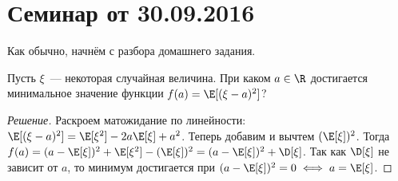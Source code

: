 \section{Семинар от 30.09.2016}
Как обычно, начнём с разбора домашнего задания.
\begin{problem}
    Пусть \(\xi\)~--- некоторая случайная величина. При каком \(a \in \R\) достигается
    минимальное значение функции \(f(a) = \E[(\xi - a)^2]\)?
\end{problem}
\begin{proof}[Решение]
    Раскроем матожидание по линейности: \(\E[(\xi - a)^2] = \E[\xi^2] - 2a\E[\xi] + a^2\). Теперь добавим и вычтем \((\E[\xi])^2\). Тогда \(f(a) = (a - \E[\xi])^2 + \E[\xi^2] - (\E[\xi])^2 = (a - \E[\xi])^2 + \D[\xi]\). Так как \(\D[\xi]\) не зависит от \(a\), то минимум достигается при \((a - \E[\xi])^2 = 0 \iff a = \E[\xi]\).
\end{proof}

